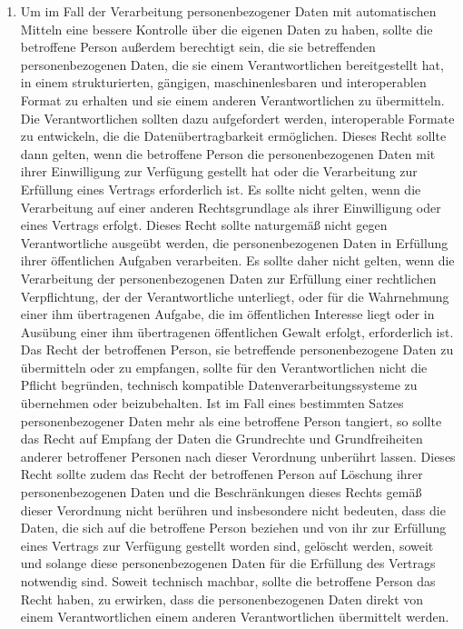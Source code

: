 \begin{enumerate}
   \item Um im Fall der Verarbeitung personenbezogener Daten mit automatischen Mitteln eine bessere Kontrolle über die
    eigenen Daten zu haben, sollte die betroffene Person außerdem berechtigt sein, die sie betreffenden
    personenbezogenen Daten, die sie einem Verantwortlichen bereitgestellt hat, in einem strukturierten, gängigen,
    maschinenlesbaren und interoperablen Format zu erhalten und sie einem anderen Verantwortlichen zu übermitteln. Die
    Verantwortlichen sollten dazu aufgefordert werden, interoperable Formate zu entwickeln, die die
    Datenübertragbarkeit ermöglichen. Dieses Recht sollte dann gelten, wenn die betroffene Person die personenbezogenen
    Daten mit ihrer Einwilligung zur Verfügung gestellt hat oder die Verarbeitung zur Erfüllung eines Vertrags
    erforderlich ist. Es sollte nicht gelten, wenn die Verarbeitung auf einer anderen Rechtsgrundlage als ihrer
    Einwilligung oder eines Vertrags erfolgt. Dieses Recht sollte naturgemäß nicht gegen Verantwortliche ausgeübt
    werden, die personenbezogenen Daten in Erfüllung ihrer öffentlichen Aufgaben verarbeiten. Es sollte daher nicht
    gelten, wenn die Verarbeitung der personenbezogenen Daten zur Erfüllung einer rechtlichen Verpflichtung, der der
    Verantwortliche unterliegt, oder für die Wahrnehmung einer ihm übertragenen Aufgabe, die im öffentlichen Interesse
    liegt oder in Ausübung einer ihm übertragenen öffentlichen Gewalt erfolgt, erforderlich ist. Das Recht der
    betroffenen Person, sie betreffende personenbezogene Daten zu übermitteln oder zu empfangen, sollte für den
    Verantwortlichen nicht die Pflicht begründen, technisch kompatible Datenverarbeitungssysteme zu übernehmen oder
    beizubehalten. Ist im Fall eines bestimmten Satzes personenbezogener Daten mehr als eine betroffene Person
    tangiert, so sollte das Recht auf Empfang der Daten die Grundrechte und Grundfreiheiten anderer betroffener
    Personen nach dieser Verordnung unberührt lassen. Dieses Recht sollte zudem das Recht der betroffenen Person auf
    Löschung ihrer personenbezogenen Daten und die Beschränkungen dieses Rechts gemäß dieser Verordnung nicht berühren
    und insbesondere nicht bedeuten, dass die Daten, die sich auf die betroffene Person beziehen und von ihr zur
    Erfüllung eines Vertrags zur Verfügung gestellt worden sind, gelöscht werden, soweit und solange diese
    personenbezogenen Daten für die Erfüllung des Vertrags notwendig sind. Soweit technisch machbar, sollte die
    betroffene Person das Recht haben, zu erwirken, dass die personenbezogenen Daten direkt von einem Verantwortlichen
    einem anderen Verantwortlichen übermittelt werden.%
   \label{itm:eg-68}
   

\end{enumerate}
